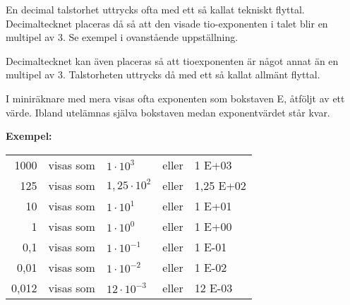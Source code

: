 
En decimal talstorhet uttrycks ofta med ett så kallat tekniskt flyttal.
Decimaltecknet placeras då så att den visade tio-exponenten i talet
blir en multipel av 3.
Se exempel i ovanstående uppställning.

Decimaltecknet kan även placeras så att tioexponenten är något annat
än en multipel av 3.
Talstorheten uttrycks då med ett så kallat allmänt flyttal.

I miniräknare med mera visas ofta exponenten som bokstaven E, åtföljt av
ett värde.
Ibland utelämnas själva bokstaven medan exponentvärdet står kvar.

\noindent\textbf{Exempel:}

\begin{tabular}{rllll}
1000  & visas som & \(1    \cdot 10^3  \) & eller & 1 E+03 \\
125   & visas som & \(1,25 \cdot 10^2  \) & eller & 1,25 E+02 \\
10    & visas som & \(1    \cdot 10^1  \) & eller & 1 E+01 \\
1     & visas som & \(1    \cdot 10^0  \) & eller & 1 E+00 \\
0,1   & visas som & \(1    \cdot 10^{-1}\) & eller & 1 E-01 \\
0,01  & visas som & \(1    \cdot 10^{-2}\) & eller & 1 E-02 \\
0,012 & visas som & \(12   \cdot 10^{-3}\) & eller & 12 E-03 \\
\end{tabular}




